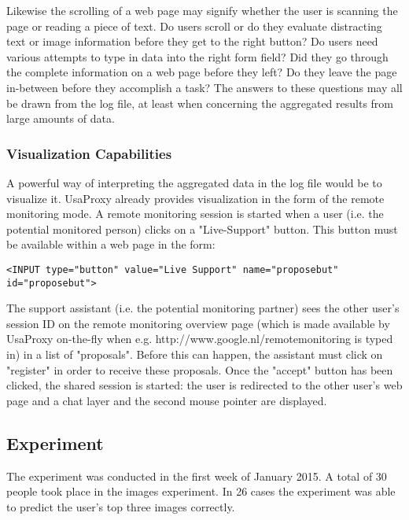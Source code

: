 Likewise the scrolling of a web page may signify whether the user is scanning the page or reading a piece of text. Do users scroll or do they evaluate distracting text or image information before they get to the right button? Do users need various attempts to type in data into the right form field?
Did they go through the complete information on a web page before they left? Do they leave the page in-between before they accomplish a task? The answers to these questions may all be drawn from the log file, at least when concerning the aggregated results from large amounts of data.

\subsubsection{Visualization Capabilities}
A powerful way of interpreting the aggregated data in the log file would be to visualize it. UsaProxy already provides visualization in the form of the remote monitoring mode. A remote monitoring session is started when a user (i.e. the potential monitored person) clicks on a "Live-Support" button. This button must be available within a web page in the form:
\begin{lstlisting}
<INPUT type="button" value="Live Support" name="proposebut" id="proposebut">
\end{lstlisting}

The support assistant (i.e. the potential monitoring partner) sees the other user's session ID on the remote monitoring overview page (which is made available by UsaProxy on-the-fly when e.g. http://www.google.nl/remotemonitoring is typed in) in a list of "proposals". Before this can happen, the assistant must click on "register" in order to receive these proposals. Once the "accept" button has been clicked, the shared session is started: the user is redirected to the other user's web page and a chat layer and the second mouse pointer are displayed. 

\subsection{Experiment}
The experiment was conducted in the first week of January 2015. A total of 30 people took place in the images experiment. In 26 cases the experiment was able to predict the user's top three images correctly.